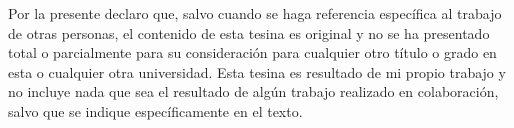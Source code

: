 
\begin{declaration}

Por la presente declaro que, salvo cuando se haga referencia específica al trabajo de otras personas, el contenido de esta tesina es original y no se ha presentado total o parcialmente para su consideración para cualquier otro título o grado en esta o cualquier otra universidad. Esta tesina es resultado de mi propio trabajo y no incluye nada que sea el resultado de algún trabajo realizado en colaboración, salvo que se indique específicamente en el texto. 

\end{declaration}
